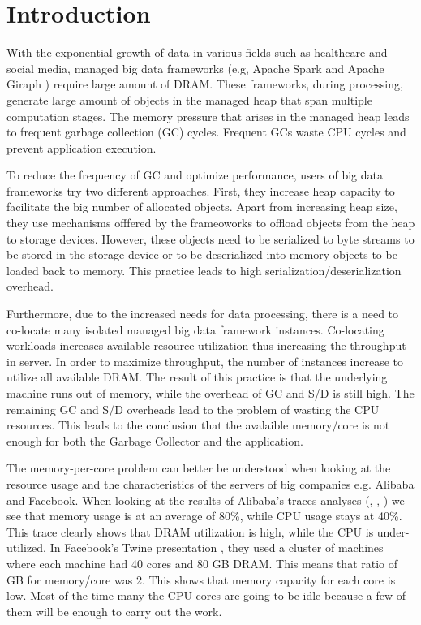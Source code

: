 \section{Introduction}
\label{sec:intro}

With the exponential growth of data in various fields such as
healthcare and social media, managed big data frameworks (e.g, Apache
Spark \cite{Spark} and Apache Giraph \cite{Giraph}) require large
amount of DRAM. These frameworks, during processing, generate large
amount of objects in the managed heap that span multiple computation
stages. The memory pressure that arises in the managed heap leads to
frequent garbage collection (GC) cycles. Frequent GCs waste CPU cycles 
and prevent application execution.

To reduce the frequency of GC and optimize performance, users of big data
frameworks try two different approaches. First, they increase heap capacity to
facilitate the big number of allocated objects. Apart from increasing
heap size, they use mechanisms offfered by the frameoworks 
to offload objects from the heap to storage devices. However, these
objects need to be serialized to byte streams to be stored in the storage
device or to be deserialized into memory objects to be loaded back to memory. 
This practice leads to high serialization/deserialization overhead.

Furthermore, due to the increased needs for data processing, there is
a need to co-locate many isolated managed big data framework
instances. Co-locating workloads increases available resource utilization
thus increasing the throughput in server. 
In order to maximize throughput, the number of instances
increase to utilize all available DRAM. The result of this
practice is that the underlying machine runs out of memory, while the
 overhead of GC and S/D is still high. The remaining GC and S/D
overheads lead to the problem of wasting the CPU resources. This
leads to the conclusion that the avalaible memory/core is
not enough for both the Garbage Collector and the application.

The memory-per-core problem can better be understood when looking at
the resource usage and the characteristics of the servers of big
companies e.g. Alibaba and Facebook. When looking at the results of
Alibaba's traces analyses (\cite{Alibaba}, \cite{Alibaba1},
\cite{Alibabacolocated}) we see that memory usage is at an average of
80\%, while CPU usage stays at 40\%. This trace clearly shows that
DRAM utilization is high, while the CPU is under-utilized. In
Facebook's Twine presentation \cite{Twine}, they used a cluster of
machines where each machine had 40 cores and 80 GB DRAM. This means
that ratio of GB for memory/core was 2. This shows that memory
capacity for each core is low. Most of the time many the CPU cores are
going to be idle because a few of them will be enough to carry out the
work.

